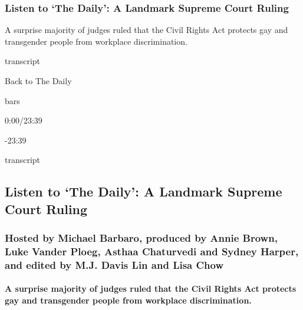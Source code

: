 \hypertarget{listen-to-the-daily-a-landmark-supreme-court-ruling}{%
\subsubsection{Listen to `The Daily': A Landmark Supreme Court
Ruling}\label{listen-to-the-daily-a-landmark-supreme-court-ruling}}

A surprise majority of judges ruled that the Civil Rights Act protects
gay and transgender people from workplace discrimination.

transcript

Back to The Daily

bars

0:00/23:39

-23:39

transcript

\hypertarget{listen-to-the-daily-a-landmark-supreme-court-ruling-1}{%
\subsection{Listen to `The Daily': A Landmark Supreme Court
Ruling}\label{listen-to-the-daily-a-landmark-supreme-court-ruling-1}}

\hypertarget{hosted-by-michael-barbaro-produced-by-annie-brown-luke-vander-ploeg-asthaa-chaturvedi-and-sydney-harper-and-edited-by-mj-davis-lin-and-lisa-chow}{%
\subsubsection{Hosted by Michael Barbaro, produced by Annie Brown, Luke
Vander Ploeg, Asthaa Chaturvedi and Sydney Harper, and edited by M.J.
Davis Lin and Lisa
Chow}\label{hosted-by-michael-barbaro-produced-by-annie-brown-luke-vander-ploeg-asthaa-chaturvedi-and-sydney-harper-and-edited-by-mj-davis-lin-and-lisa-chow}}

\hypertarget{a-surprise-majority-of-judges-ruled-that-the-civil-rights-act-protects-gay-and-transgender-people-from-workplace-discrimination}{%
\paragraph{A surprise majority of judges ruled that the Civil Rights Act
protects gay and transgender people from workplace
discrimination.}\label{a-surprise-majority-of-judges-ruled-that-the-civil-rights-act-protects-gay-and-transgender-people-from-workplace-discrimination}}

